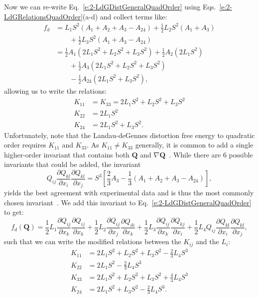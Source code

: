 Now we can re-write Eq.~\ref{e:2-LdGDistGeneralQuadOrder} using Eqs.~\ref{e:2-LdGRelationsQuadOrder}(a-d) and collect terms like:
\begin{align}
  f_d &= L_1 S^2 (A_1 + A_2 + A_3 -A_{24}) + \frac{1}{2}L_2 S^2 (A_1 + A_3) \nonumber \\
  & \quad \quad + \frac{1}{2}L_3 S^2 (A_1 + A_3 - A_{24}) \\
      &= \frac{1}{2}A_1(2 L_1 S^2 + L_2 S^2 +L_3 S^2) + \frac{1}{2}A_2(2 L_1 S^2) \nonumber \\
      & \quad \quad + \frac{1}{2}A_3(2 L_1 S^2 + L_2 S^2 +L_3 S^2) \nonumber \\
      & \quad \quad - \frac{1}{2}A_{24}(2 L_1 S^2 + L_3 S^2),
\end{align}
allowing us to write the relations:
\begin{align}
  K_{11} &= K_{33} = 2 L_1 S^2 + L_2 S^2 +L_3 S^2\tag{\theequation a}\\
  K_{22} &= 2 L_1 S^2\tag{\theequation b}\\
  K_{24} &= 2 L_1 S^2 + L_3 S^2.\tag{\theequation c}
\end{align}
Unfortunately, note that the Landau-deGennes distortion free energy to quadratic order requires $K_{11}$ and $K_{33}$.
As $K_{11} \neq K_{33}$ generally, it is common to add a single higher-order invariant that contains both $\mathbf{Q}$ and $\nabla \mathbf{Q}$~\cite{RN189,RN198,RN190}.
While there are 6 possible invariants that could be added, the invariant
\begin{equation}
  Q_{ij}\frac{\partial Q_{kl}}{\partial x_i} \frac{\partial Q_{kl}}{\partial x_j} = S^3 \left [\frac{2}{3}A_3 - \frac{1}{3}(A_1+A_2+A_3-A_{24}) \right ],
\end{equation}
yields the best agreement with experimental data and is thus the most commonly chosen invariant~\cite{RN189,RN198,RN190}.
We add this invariant to Eq.~\ref{e:2-LdGDistGeneralQuadOrder} to get:
\begin{equation}
  f_d(\mathbf{Q}) = \frac{1}{2} L_1 \frac{\partial Q_{ij}}{\partial x_k} \frac{\partial Q_{ij}}{\partial x_k}
    + \frac{1}{2} L_2 \frac{\partial Q_{ij}}{\partial x_j} \frac{\partial Q_{ik}}{\partial x_k}
    + \frac{1}{2} L_3 \frac{\partial Q_{ij}}{\partial x_k} \frac{\partial Q_{kj}}{\partial x_i}
    + \frac{1}{2} L_4 Q_{ij}\frac{\partial Q_{kl}}{\partial x_i} \frac{\partial Q_{kl}}{\partial x_j},\label{e:2-LdGDistGeneralHighOrder}
\end{equation}
such that we can write the modified relations between the $K_{ij}$ and the $L_i$:
\begin{align}\label{e:2-LdGFrankRelations}
  K_{11} &= 2 L_1 S^2 + L_2 S^2 +L_3 S^2 - \frac{2}{3}L_4 S^3\tag{\theequation a} \\
  K_{22} &= 2 L_1 S^2 - \frac{2}{3}L_4 S^3\tag{\theequation b} \\
  K_{33} &= 2 L_1 S^2 + L_2 S^2 +L_3 S^2 + \frac{4}{3}L_4 S^3\tag{\theequation c}\\
  K_{24} &= 2 L_1 S^2 + L_3 S^2 - \frac{2}{3}L_4 S^3\tag{\theequation d}.
\end{align}


